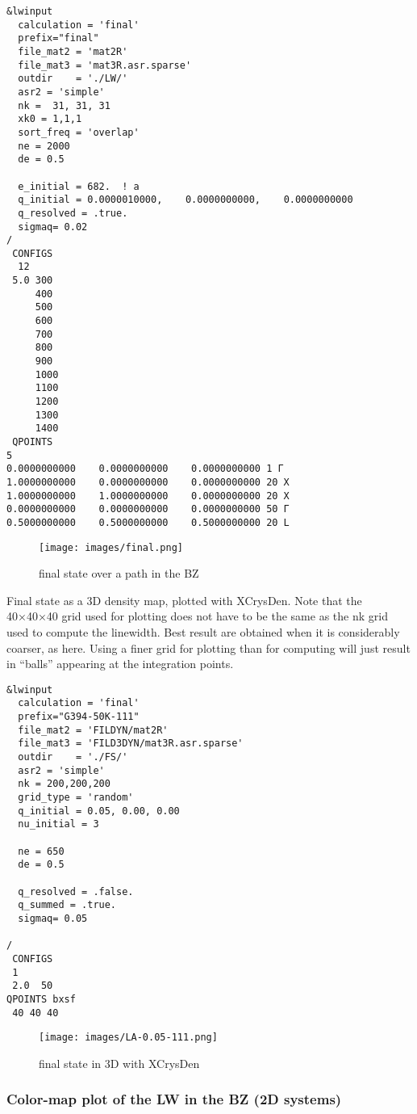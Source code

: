 \documentclass[
]{article}
\begin{document}
\begin{verbatim}
&lwinput
  calculation = 'final'
  prefix="final"
  file_mat2 = 'mat2R'
  file_mat3 = 'mat3R.asr.sparse'
  outdir    = './LW/'  
  asr2 = 'simple'   
  nk =  31, 31, 31
  xk0 = 1,1,1
  sort_freq = 'overlap'
  ne = 2000
  de = 0.5

  e_initial = 682.  ! a
  q_initial = 0.0000010000,    0.0000000000,    0.0000000000 
  q_resolved = .true.
  sigmaq= 0.02
/
 CONFIGS
  12
 5.0 300
     400
     500
     600
     700
     800
     900
     1000
     1100
     1200
     1300
     1400
 QPOINTS 
5
0.0000000000    0.0000000000    0.0000000000 1 Γ
1.0000000000    0.0000000000    0.0000000000 20 X
1.0000000000    1.0000000000    0.0000000000 20 X
0.0000000000    0.0000000000    0.0000000000 50 Γ
0.5000000000    0.5000000000    0.5000000000 20 L
\end{verbatim}

\begin{figure}
\centering
\texttt{[image: images/final.png]}
\caption{final state over a path in the BZ}
\end{figure}

Final state as a 3D density map, plotted with XCrysDen. Note that the
40×40×40 grid used for plotting does not have to be the same as the nk
grid used to compute the linewidth. Best result are obtained when it is
considerably coarser, as here. Using a finer grid for plotting than for
computing will just result in \enquote{balls} appearing at the
integration points.

\begin{verbatim}
&lwinput
  calculation = 'final'
  prefix="G394-50K-111"
  file_mat2 = 'FILDYN/mat2R'
  file_mat3 = 'FILD3DYN/mat3R.asr.sparse'
  outdir    = './FS/'
  asr2 = 'simple'
  nk = 200,200,200
  grid_type = 'random'
  q_initial = 0.05, 0.00, 0.00
  nu_initial = 3

  ne = 650
  de = 0.5

  q_resolved = .false.
  q_summed = .true.
  sigmaq= 0.05

/
 CONFIGS 
 1
 2.0  50
QPOINTS bxsf
 40 40 40
\end{verbatim}

\begin{figure}
\centering
\texttt{[image: images/LA-0.05-111.png]}
\caption{final state in 3D with XCrysDen}
\end{figure}

\hypertarget{color-map-plot-of-the-lw-in-the-bz-2d-systems}{%
\subsubsection{Color-map plot of the LW in the BZ (2D
systems)}\label{color-map-plot-of-the-lw-in-the-bz-2d-systems}}
\end{document}
